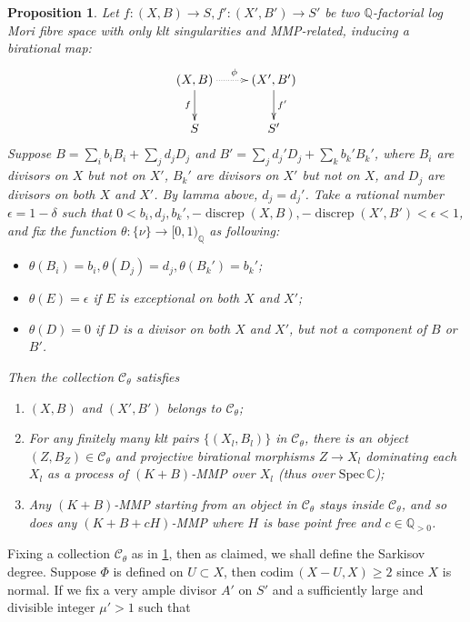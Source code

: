 \documentclass{article}
\newtheorem{prop}[defn]{Proposition}
\begin{document}
\begin{prop}\label{cat}
  Let $ f:(X,B)\to S,f':(X',B')\to S' $ be two $ \mathbb{Q} $-factorial log Mori fibre space  with only klt singularities and MMP-related, inducing a birational map:
  \[ \xymatrix{
      (X,B)\ar[d]_f\ar@{.>}[r]^\phi&(X',B')\ar[d]^{f'}\\
 S&S'} \]
  Suppose  $ B=\sum_ib_iB_i+\sum_jd_jD_j $ and $ B'=\sum_jd_j'D_j+\sum_kb_k'B_k' $, where $ B_i $ are divisors on $ X $ but not on $ X' $, $ B_k' $ are divisors on $ X' $ but not on $ X $, and $ D_j $ are divisors on both $ X $ and $ X' $. By lamma above, $ d_j=d_j' $. Take a rational number $ \epsilon=1-\delta $ such that $ 0<b_i,d_j,b_k', -\operatorname{discrep}(X,B),-\operatorname{discrep}(X',B')<\epsilon<1 $, and fix the function $ \theta:\{\nu\}\to [0,1)_\mathbb{Q} $ as following:
  \begin{itemize}
    \item $ \theta(B_i)=b_i, \theta(D_j)=d_j,\theta(B_k')=b_k'$;
    \item $ \theta(E)=\epsilon $ if $ E $ is exceptional on both $ X $ and $ X' $;
    \item $ \theta(D)=0 $ if $ D $ is a divisor on both $ X $ and $ X' $, but not a component of $ B $ or $ B' $.
  \end{itemize}
  Then the collection $ \mathcal{C}_\theta $ satisfies
  \begin{enumerate}[1)]
    \item $ (X,B) $ and $ (X',B') $ belongs to $ \mathcal{C}_\theta $;
    \item For any finitely many klt pairs $ \{(X_l,B_l)\} $ in $ \mathcal{C}_\theta $, there is an object $ (Z,B_Z)\in \mathcal{C}_\theta $ and projective birational morphisms $ Z\to X_l $ dominating each  $ X_l $ as a process of $ (K+B) $-MMP over $ X_l $ (thus over $ \mathrm{Spec}\,\mathbb{C} $);
    \item Any $ (K+B) $-MMP starting from an object in $ \mathcal{C}_\theta $ stays inside $ \mathcal{C}_\theta $, and so does any $ (K+B+cH) $-MMP where $ H $ is base point free and $ c\in \mathbb{Q}_{>0} $. 
  \end{enumerate}
\end{prop}
Fixing a collection $ \mathcal{C}_\theta $ as in \ref{cat}, then as claimed, we shall define the Sarkisov degree. Suppose $ \Phi $ is defined on $ U\subset X $, then $ \mathrm{codim}\,(X-U,X)\geqslant 2 $ since $ X $ is normal. If we fix a very ample divisor $ A'  $ on $ S' $ and a sufficiently large and divisible integer $ \mu'>1 $ such that 
\end{document}
